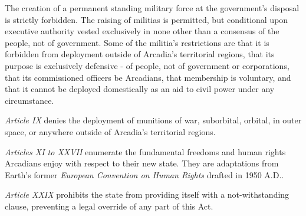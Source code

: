 The creation of a permanent standing military force at the government's disposal is strictly forbidden. The raising of militias is permitted, but conditional upon executive authority vested exclusively in none other than a consensus of the people, not of government. Some of the militia's restrictions are that it is forbidden from deployment outside of Arcadia's territorial regions, that its purpose is exclusively defensive - of people, not of government or corporations, that its commissioned officers be Arcadians, that membership is voluntary, and that it cannot be deployed domestically as an aid to civil power under any circumstance.

\item {\it Article IX} denies the deployment of munitions of war, suborbital, orbital, in outer space, or anywhere outside of Arcadia's territorial regions.

\item {\it Articles XI to XXVII} enumerate the fundamental freedoms and human rights Arcadians enjoy with respect to their new state. They are adaptations from Earth's former {\it European Convention on Human Rights} drafted in 1950 A.D..

\item {\it Article XXIX} prohibits the state from providing itself with a not-withstanding clause, preventing a legal override of any part of this Act.
\stopitemize

